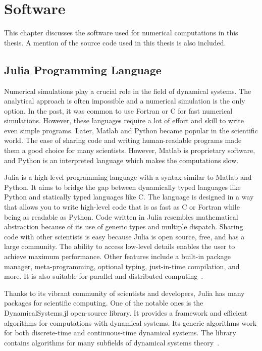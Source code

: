 \chapter{Software}
\label{sec:software}

This chapter discusses the software used for numerical computations in this thesis.
A mention of the source code used in this thesis is also included.

\section{Julia Programming Language}
Numerical simulations play a crucial role in the field of dynamical systems.
The analytical approach is often impossible and a numerical simulation is the only option.
In the past, it was common to use Fortran or C for fast numerical simulations.
However, these languages require a lot of effort and skill to write even simple programs.
Later, Matlab and Python became popular in the scientific world.
The ease of sharing code and writing human-readable programs made them a good choice for many scientists.
However, Matlab is proprietary software, and Python is an interpreted language which makes the computations slow.
\par
Julia is a high-level programming language with a syntax similar to Matlab and Python.
It aims to bridge the gap between dynamically typed languages like Python and statically typed languages like C.
The language is designed in a way that allows you to write high-level code that is as fast as C or Fortran while being as readable as Python.
Code written in Julia resembles mathematical abstraction because of its use of generic types and multiple dispatch. 
Sharing code with other scientists is easy because Julia is open source, free, and has a large community. 
The ability to access low-level details enables the user to achieve maximum performance.
Other features include a built-in package manager, meta-programming, optional typing, just-in-time compilation, and more.
It is also suitable for parallel and distributed computing~\cite{Bezanson2017,Bezanson20181024}.
\par
Thanks to its vibrant community of scientists and developers, Julia has many packages for scientific computing.
One of the notable ones is the DynamicalSystems.jl open-source library.
It provides a framework and efficient algorithms for computations with dynamical systems.
Its generic algorithms work for both discrete-time and continuous-time dynamical systems.
The library contains algorithms for many subfields of dynamical systems theory~\cite{Datseris2018}.
